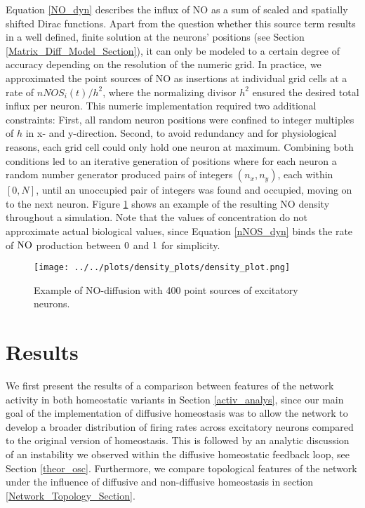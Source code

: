 \documentclass[10pt,a4paper]{article}
\begin{document}
Equation \eqref{NO_dyn} describes the influx of NO as a sum of scaled and spatially shifted Dirac functions. Apart from the question whether this source term results in a well defined, finite solution at the neurons' positions (see Section \ref{Matrix_Diff_Model_Section}), it can only be modeled to a certain degree of accuracy depending on the resolution of the numeric grid. In practice, we approximated the point sources of NO as insertions at individual grid cells at a rate of $nNOS_i(t) / h^2$, where the normalizing divisor $h^2$ ensured the desired total influx per neuron. This numeric implementation required two additional constraints: First, all random neuron positions were confined to integer multiples of $h$ in x- and y-direction. Second, to avoid redundancy and for physiological reasons, each grid cell could only hold one neuron at maximum. Combining both conditions led to an iterative generation of positions where for each neuron a random number generator produced pairs of integers $(n_x,n_y)$, each within $[0,N]$, until an unoccupied pair of integers was found and occupied, moving on to the next neuron. Figure \ref{diff_test_plot} shows an example of the resulting NO density throughout a simulation. Note that the values of concentration do not approximate actual biological values, since Equation \eqref{nNOS_dyn} binds the rate of $\rm NO$ production between $\rm 0$ and $\rm 1$ for simplicity.
\begin{figure}[h!]
\begin{center}
\texttt{[image: ../../plots/density\_plots/density\_plot.png]}
\end{center}
\caption{Example of NO-diffusion with 400 point sources of excitatory neurons.}
\label{diff_test_plot}
\end{figure}

\clearpage

\section{Results} \label{results}
We first present the results of a comparison between features of the network activity in both homeostatic variants in Section \ref{activ_analys}, since our main goal of the implementation of diffusive homeostasis was to allow the network to develop a broader distribution of firing rates across excitatory neurons compared to the original version of homeostasis. This is followed by an analytic discussion of an instability we observed within the diffusive homeostatic feedback loop, see Section \ref{theor_osc}. Furthermore, we compare topological features of the network under the influence of diffusive and non-diffusive homeostasis in section \ref{Network_Topology_Section}. 
\end{document}
